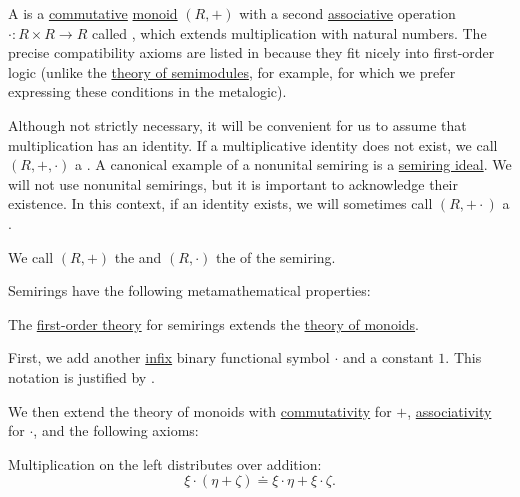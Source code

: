 \begin{definition}\label{def:semiring}
  A  is a \hyperref[def:magma/commutative]{commutative} \hyperref[def:monoid]{monoid} \( (R, +) \) with a second \hyperref[def:magma/associative]{associative} operation \( \cdot: R \times R \to R \) called , which extends multiplication with natural numbers. The precise compatibility axioms are listed in  because they fit nicely into first-order logic (unlike the \hyperref[def:semimodule/theory]{theory of semimodules}, for example, for which we prefer expressing these conditions in the metalogic).

  Although not strictly necessary, it will be convenient for us to assume that multiplication has an identity. If a multiplicative identity does not exist, we call \( (R, +, \cdot) \) a . A canonical example of a nonunital semiring is a \hyperref[def:semiring_ideal]{semiring ideal}. We will not use nonunital semirings, but it is important to acknowledge their existence. In this context, if an identity exists, we will sometimes call \( (R, + \cdot) \) a .

  We call \( (R, +) \) the  and \( (R, \cdot) \) the  of the semiring.

  Semirings have the following metamathematical properties:
  \begin{thmenum}
     The \hyperref[def:first_order_theory]{first-order theory} for semirings extends the \hyperref[def:monoid/theory]{theory of monoids}.

    First, we add another \hyperref[rem:first_order_formula_conventions/infix]{infix} binary functional symbol \( \cdot \) and a constant \( 1 \). This notation is justified by .

    We then extend the theory of monoids with \hyperref[def:magma/commutative]{commutativity} for \( + \), \hyperref[def:magma/associative]{associativity} for \( \cdot \), and the following axioms:
    \begin{thmenum}
       Multiplication on the left distributes over addition:
      \begin{equation}\label{eq:def:semiring/left_distributivity}
        \xi \cdot (\eta + \zeta) \doteq \xi \cdot \eta + \xi \cdot \zeta.
      \end{equation}


\end{thmenum}
\end{thmenum}
\end{definition}
